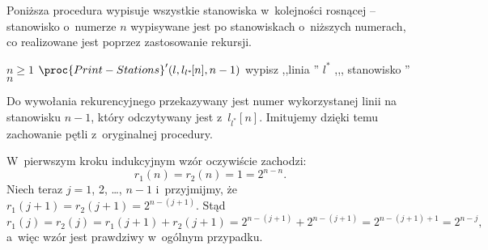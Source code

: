 
\exercise %
Poniższa procedura wypisuje wszystkie stanowiska w~kolejności rosnącej -- stanowisko o~numerze $n$ wypisywane jest po stanowiskach o~niższych numerach, co realizowane jest poprzez zastosowanie rekursji.
\begin{codebox}
\li	\If $n\ge1$
\li	\Then $\proc{Print-Stations}'(l,l_{l^*\!}[n],n-1)$
\li		wypisz ,,linia '' $l^*\!$ ,,{}, stanowisko '' $n$
	\End
\end{codebox}
Do wywołania rekurencyjnego przekazywany jest numer wykorzystanej linii na stanowisku $n-1$, który odczytywany jest z~$l_{l^*\!}[n]$.
Imitujemy dzięki temu zachowanie pętli z~oryginalnej procedury.

\exercise %
W~pierwszym kroku indukcyjnym wzór oczywiście zachodzi:
\[
	r_1(n) = r_2(n) = 1 = 2^{n-n}.
\]
Niech teraz $j=1$, 2, \dots, $n-1$ i~przyjmijmy, że $r_1(j+1)=r_2(j+1)=2^{n-(j+1)}$.
Stąd
\[
	r_1(j) = r_2(j) = r_1(j+1)+r_2(j+1) = 2^{n-(j+1)}+2^{n-(j+1)} = 2^{n-(j+1)+1} = 2^{n-j},
\]
a~więc wzór jest prawdziwy w~ogólnym przypadku.

\exercise %
\exercise %
\exercise %
